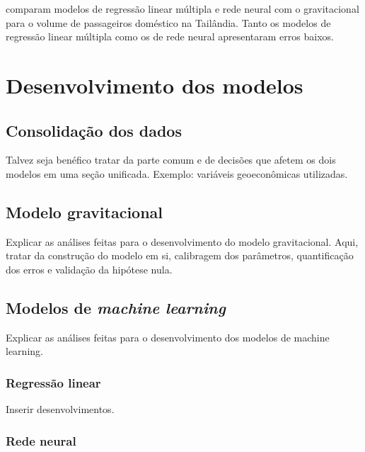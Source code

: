 \documentclass[12pt]{article}
\begin{document}
\citet{erjongmanee2018} comparam modelos de regressão linear múltipla e
rede neural com o gravitacional para o volume de passageiros doméstico
na Tailândia. Tanto os modelos de regressão linear múltipla como os de
rede neural apresentaram erros baixos.

\hypertarget{desenvolvimento-dos-modelos}{%
\section{Desenvolvimento dos
modelos}\label{desenvolvimento-dos-modelos}}

\hypertarget{consolidauxe7uxe3o-dos-dados}{%
\subsection{Consolidação dos dados}\label{consolidauxe7uxe3o-dos-dados}}

Talvez seja benéfico tratar da parte comum e de decisões que afetem os
dois modelos em uma seção unificada. Exemplo: variáveis geoeconômicas
utilizadas.

\hypertarget{modelo-gravitacional-1}{%
\subsection{Modelo gravitacional}\label{modelo-gravitacional-1}}

Explicar as análises feitas para o desenvolvimento do modelo
gravitacional. Aqui, tratar da construção do modelo em si, calibragem
dos parâmetros, quantificação dos erros e validação da hipótese nula.

\hypertarget{modelos-de-machine-learning-1}{%
\subsection{\texorpdfstring{Modelos de \emph{machine
learning}}{Modelos de machine learning}}\label{modelos-de-machine-learning-1}}

Explicar as análises feitas para o desenvolvimento dos modelos de
machine learning.

\hypertarget{regressuxe3o-linear}{%
\subsubsection{Regressão linear}\label{regressuxe3o-linear}}

Inserir desenvolvimentos.

\hypertarget{rede-neural}{%
\subsubsection{Rede neural}\label{rede-neural}}
\end{document}
